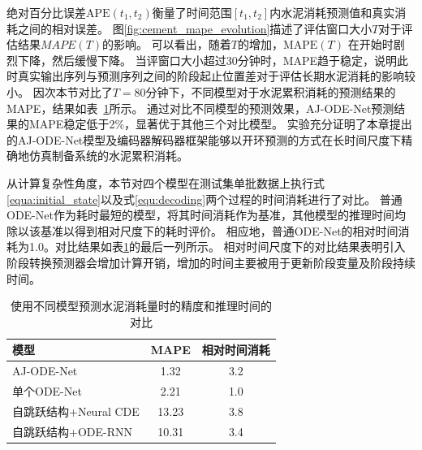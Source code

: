绝对百分比误差$\text{APE}(t_1,t_2)$衡量了时间范围$[t_1, t_2]$内水泥消耗预测值和真实消耗之间的相对误差。
图\ref{fig:cement_mape_evolution}描述了评估窗口大小$T$对于评估结果$MAPE(T)$的影响。
可以看出，随着$T$的增加，$\text{MAPE}(T)$ 在开始时剧烈下降，然后缓慢下降。
当评窗口大小超过30分钟时，MAPE趋于稳定，说明此时真实输出序列与预测序列之间的阶段起止位置差对于评估长期水泥消耗的影响较小。
因次本节对比了$T=80$分钟下，不同模型对于水泥累积消耗的预测结果的MAPE，结果如表~\ref{tab:paste_model_cmp}所示。
通过对比不同模型的预测效果，AJ-ODE-Net预测结果的MAPE稳定低于2\%，显著优于其他三个对比模型。
实验充分证明了本章提出的AJ-ODE-Net模型及编码器解码器框架能够以开环预测的方式在长时间尺度下精确地仿真制备系统的水泥累积消耗。

从计算复杂性角度，本节对四个模型在测试集单批数据上执行式\eqref{equa:initial_state}以及式\eqref{equ:decoding}两个过程的时间消耗进行了对比。
普通ODE-Net作为耗时最短的模型，将其时间消耗作为基准，其他模型的推理时间均除以该基准以得到相对尺度下的耗时评价。
相应地，普通ODE-Net的相对时间消耗为1.0。对比结果如表\ref{tab:paste_model_cmp}的最后一列所示。
相对时间尺度下的对比结果表明引入阶段转换预测器会增加计算开销，增加的时间主要被用于更新阶段变量及阶段持续时间。

\begin{table}[t]
    \centering
    \caption{使用不同模型预测水泥消耗量时的精度和推理时间的对比}
        \begin{tabular}{lcc} 
        \toprule
        模型               & MAPE  & 相对时间消耗  \\ 
        \hline
        AJ-ODE-Net       & 1.32  & 3.2     \\
        单个ODE-Net        & 2.21  & 1.0     \\
        自跳跃结构+Neural CDE & 13.23 & 3.8     \\
        自跳跃结构+ODE-RNN    & 10.31 & 3.4     \\
        \bottomrule
        \end{tabular}
    \label{tab:paste_model_cmp}
    \end{table}

